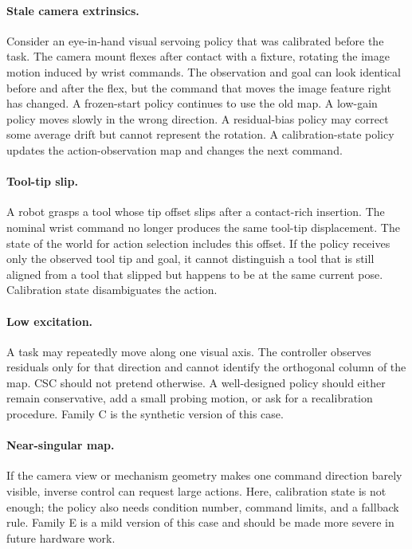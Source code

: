 \documentclass{article}
\begin{document}
\paragraph{Stale camera extrinsics.}
Consider an eye-in-hand visual servoing policy that was calibrated before the
task. The camera mount flexes after contact with a fixture, rotating the image
motion induced by wrist commands. The observation and goal can look identical
before and after the flex, but the command that moves the image feature right
has changed. A frozen-start policy continues to use the old map. A low-gain
policy moves slowly in the wrong direction. A residual-bias policy may correct
some average drift but cannot represent the rotation. A calibration-state
policy updates the action-observation map and changes the next command.

\paragraph{Tool-tip slip.}
A robot grasps a tool whose tip offset slips after a contact-rich insertion.
The nominal wrist command no longer produces the same tool-tip displacement.
The state of the world for action selection includes this offset. If the policy
receives only the observed tool tip and goal, it cannot distinguish a tool that
is still aligned from a tool that slipped but happens to be at the same current
pose. Calibration state disambiguates the action.

\paragraph{Low excitation.}
A task may repeatedly move along one visual axis. The controller observes
residuals only for that direction and cannot identify the orthogonal column of
the map. CSC should not pretend otherwise. A well-designed policy should
either remain conservative, add a small probing motion, or ask for a
recalibration procedure. Family C is the synthetic version of this case.

\paragraph{Near-singular map.}
If the camera view or mechanism geometry makes one command direction barely
visible, inverse control can request large actions. Here, calibration state is
not enough; the policy also needs condition number, command limits, and a
fallback rule. Family E is a mild version of this case and should be made more
severe in future hardware work.
\end{document}

